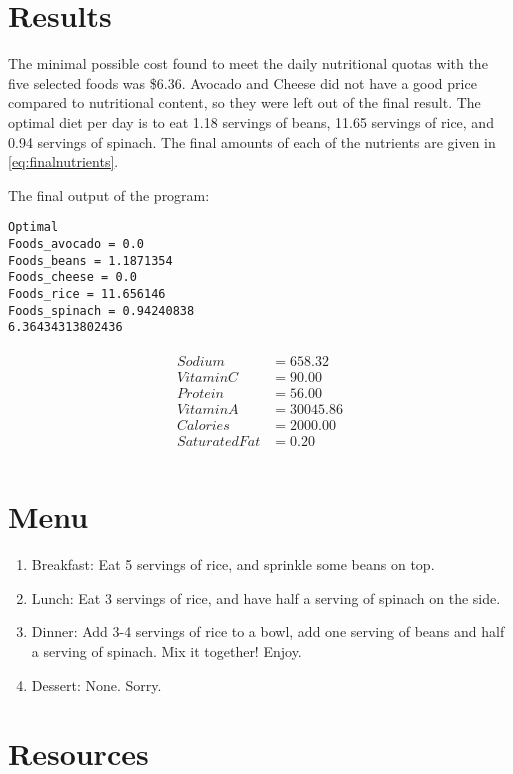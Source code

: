\documentclass[paper=a4, fontsize=11pt]{scrartcl}
\numberwithin{equation}{section}		%
\numberwithin{figure}{section}			%
\numberwithin{table}{section}				%
\begin{document}
\section{Results}
The minimal possible cost found to meet the daily nutritional quotas with the five selected foods was \$6.36. Avocado and Cheese did not have a good price compared to nutritional content, so they were left out of the final result. The optimal diet per day is to eat 1.18 servings of beans, 11.65 servings of rice, and 0.94 servings of spinach. The final amounts of each of the nutrients are given in \eqref{eq:finalnutrients}.

The final output of the program:

\begin{lstlisting}
Optimal
Foods_avocado = 0.0
Foods_beans = 1.1871354
Foods_cheese = 0.0
Foods_rice = 11.656146
Foods_spinach = 0.94240838
6.36434313802436
\end{lstlisting}

\begin{align}
  \begin{split}
    Sodium &= 658.32 \\
    Vitamin C &= 90.00\\
    Protein &= 56.00\\
    Vitamin A &= 30045.86\\
    Calories &= 2000.00\\
    Saturated Fat &= 0.20\\
  \end{split}
  \label{eq:finalnutrients}
\end{align}

\section{Menu}

\begin{enumerate}
	\item Breakfast:  Eat 5 servings of rice, and sprinkle some beans on top.  
	\item Lunch: Eat 3 servings of rice, and have half a serving of spinach on the side.
	\item Dinner: Add 3-4 servings of rice to a bowl, add one serving of beans and half a serving of spinach. Mix it together! Enjoy.
    \item Dessert: None. Sorry.
\end{enumerate}

\section{Resources}
\end{document}
